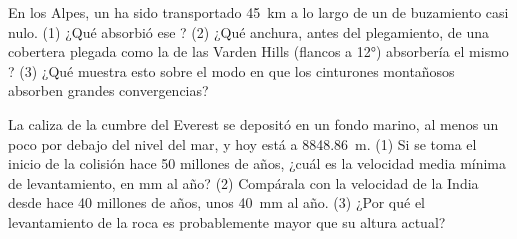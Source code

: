 \begin{exercise}[$\star\star\star$]\label{exo:g12:mountain-building:14}
En los Alpes, un  ha sido transportado \qty{45}{km} a lo
largo de un  de buzamiento casi nulo. (1) ¿Qué 
absorbió ese ? (2) ¿Qué anchura, antes del plegamiento, de una
cobertera plegada como la de las Varden Hills (flancos a \ang{12}) absorbería
el mismo ? (3) ¿Qué muestra esto sobre el modo en que los
cinturones montañosos absorben grandes convergencias?
\end{exercise}

\begin{exercise}[$\star\star\star$]\label{exo:g12:mountain-building:15}
La caliza de la cumbre del Everest se depositó en un fondo marino, al menos
un poco por debajo del nivel del mar, y hoy está a \qty{8848.86}{m}. (1) Si se
toma el inicio de la colisión hace 50 millones de años, ¿cuál es la velocidad
media mínima de levantamiento, en \unit{mm} al año? (2) Compárala con la
velocidad de la India desde hace 40 millones de años, unos \qty{40}{mm} al
año. (3) ¿Por qué el levantamiento de la roca es probablemente mayor que su
altura actual?
\end{exercise}

